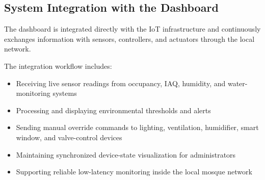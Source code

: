 
\subsection{System Integration with the Dashboard}

The dashboard is integrated directly with the IoT infrastructure and continuously exchanges information with sensors, controllers, and actuators through the local network.

The integration workflow includes:
\begin{itemize}
    \item Receiving live sensor readings from occupancy, IAQ, humidity, and water-monitoring systems
    \item Processing and displaying environmental thresholds and alerts
    \item Sending manual override commands to lighting, ventilation, humidifier, smart window, and valve-control devices
    \item Maintaining synchronized device-state visualization for administrators
    \item Supporting reliable low-latency monitoring inside the local mosque network
\end{itemize}
